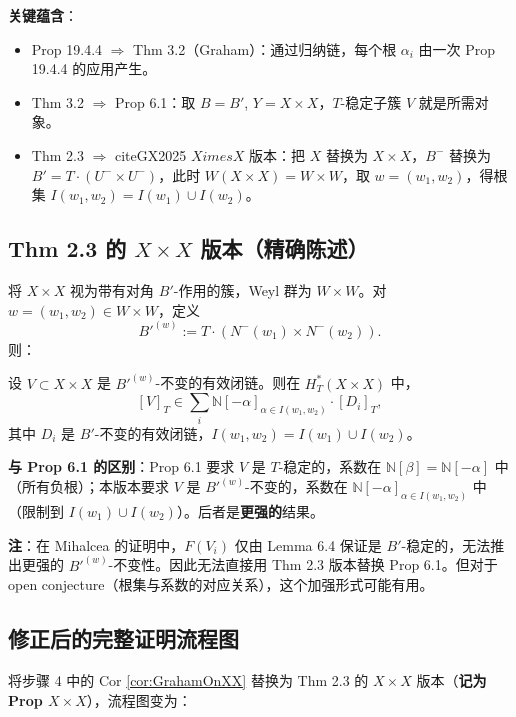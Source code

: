 \textbf{关键蕴含}：
\begin{itemize}
\item Prop 19.4.4 $\Rightarrow$ Thm 3.2（Graham）：通过归纳链，每个根 $\alpha_i$ 由一次 Prop 19.4.4 的应用产生。
\item Thm 3.2 $\Rightarrow$ Prop 6.1：取 $B = B'$, $Y = X \times X$，$T$-稳定子簇 $V$ 就是所需对象。
\item Thm 2.3 $\Rightarrow$ cite{GX2025} $X 	imes X$ 版本：把 $X$ 替换为 $X \times X$，$B^-$ 替换为 $B' = T\cdot(U^-\times U^-)$，此时 $W(X\times X) = W \times W$，取 $w = (w_1,w_2)$，得根集 $I(w_1,w_2) = I(w_1) \cup I(w_2)$。
\end{itemize}

\subsection{\cite{GX2025} Thm 2.3 的 $X \times X$ 版本（精确陈述）}
将 $X \times X$ 视为带有对角 $B'$-作用的簇，Weyl 群为 $W \times W$。对 $w = (w_1,w_2) \in W \times W$，定义
$$B'^{(w)} := T \cdot (N^-(w_1) \times N^-(w_2)).$$
则：
\begin{Theorem}
设 $V \subset X \times X$ 是 $B'^{(w)}$-不变的有效闭链。则在 $H_T^*(X \times X)$ 中，
$$[V]_T \in \sum_i \mathbb{N}[-\alpha]_{\alpha \in I(w_1,w_2)} \cdot [D_i]_T,$$
其中 $D_i$ 是 $B'$-不变的有效闭链，$I(w_1,w_2) = I(w_1) \cup I(w_2)$。
\end{Theorem}
\textbf{与 Prop 6.1 的区别}：Prop 6.1 要求 $V$ 是 $T$-稳定的，系数在 $\mathbb{N}[\beta] = \mathbb{N}[-\alpha]$ 中（所有负根）；本版本要求 $V$ 是 $B'^{(w)}$-不变的，系数在 $\mathbb{N}[-\alpha]_{\alpha \in I(w_1,w_2)}$ 中（限制到 $I(w_1) \cup I(w_2)$）。后者是\textbf{更强的}结果。

\textbf{注}：在 Mihalcea 的证明中，$F(V_i)$ 仅由 Lemma 6.4 保证是 $B'$-稳定的，无法推出更强的 $B'^{(w)}$-不变性。因此无法直接用 \cite{GX2025} Thm 2.3 版本替换 Prop 6.1。但对于 open conjecture（根集与系数的对应关系），这个加强形式可能有用。

\subsection{修正后的完整证明流程图}
将步骤 4 中的 Cor \cref{cor:GrahamOnXX} 替换为 \cite{GX2025} Thm 2.3 的 $X \times X$ 版本（\textbf{记为 \cite{GX2025} Prop $X\times X$}），流程图变为：

